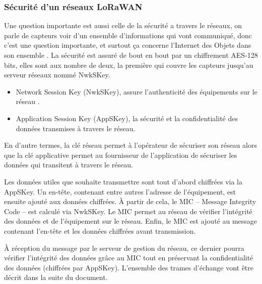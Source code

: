 \subsubsection{Sécurité d'un réseaux LoRaWAN}
Une question importante est aussi celle de la sécurité a travers le réseaux, on parle de capteurs voir d'un ensemble d'informations qui vont communiqué, donc c'est une question importante, et surtout ça concerne l'Internet des Objets dans son ensemble .
La sécurité est assuré de bout en bout par un chiffrement AES-128 bits, elles sont aux nombre de deux, la première qui couvre les capteurs jusqu'au serveur réseaux nommé NwkSKey.
\begin{itemize}
\item Network Session Key (NwkSKey), assure l’authenticité des équipements sur le réseau .
\item Application Session Key (AppSKey), la sécurité et la confidentialité des données transmises à travers le réseau.
\end{itemize}

En d’autre termes, la clé réseau permet à l’opérateur de sécuriser son réseau alors que la clé applicative permet au fournisseur de l’application de sécuriser les données qui transitent à travers le réseau.

Les données utiles que souhaite transmettre sont tout d’abord chiffrées via la AppSKey. Un en-tête, contenant entre autres l’adresse de l’équipement, est ensuite ajouté aux données chiffrées. À partir de cela, le MIC – Message Integrity Code – est calculé via NwkSKey. Le MIC permet au réseau de vérifier l’intégrité des données et de l’équipement sur le réseau. Enfin, le MIC est ajouté au message contenant l’en-tête et les données chiffrées avant transmission.

À réception du message par le serveur de gestion du réseau, ce dernier pourra vérifier l’intégrité des données grâce au MIC tout en préservant la confidentialité des données (chiffrées par AppSKey).
L'ensemble des trames d'échange vont être décrit dans la suite du document.


